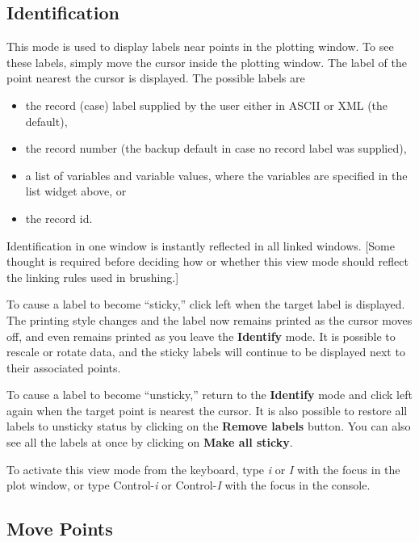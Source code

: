 \documentclass[11pt]{article}
\begin{document}
\subsection{Identification}
\label{slbl:Identify}

This mode is used to display labels near points in the plotting window.
To see these labels, simply move the cursor inside the plotting window.
The label of the point nearest the cursor is displayed.  The possible
labels are

\begin{itemize} \itemsep 0em
\item the record (case) label supplied by the user either in ASCII
      or XML (the default),
\item the record number (the backup default in case no record label was
      supplied),
\item a list of variables and variable values, where the variables are
      specified in the list widget above, or
\item the record id.
\end{itemize}

Identification in one window is instantly reflected in all linked windows.
[Some thought is required before deciding how or whether this view mode
should reflect the linking rules used in brushing.]

To cause a label to become ``sticky,'' click left when the target
label is displayed.  The printing style changes and the label now
remains printed as the cursor moves off, and even remains printed as
you leave the {\bf Identify} mode.  It is possible to rescale or
rotate data, and the sticky labels will continue to be displayed next
to their associated points.

To cause a label to become ``unsticky,'' return to the {\bf Identify}
mode and click left again when the target point is nearest the
cursor.  It is also possible to restore all labels to unsticky status
by clicking on the {\bf Remove labels} button.  You can also see all
the labels at once by clicking on {\bf Make all sticky}.

To activate this view mode from the keyboard, type {\em i} or {\em I}
with the focus in the plot window, or type Control-{\em i} or
Control-{\em I} with the focus in the console.

\subsection{Move Points}
\label{slbl:MovePoints}
\end{document}
